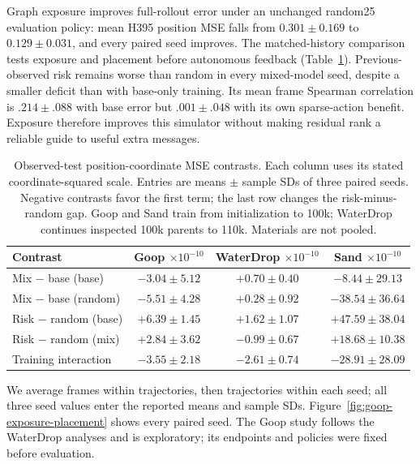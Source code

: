Graph exposure improves full-rollout error under an unchanged random25 evaluation policy: mean H395 position MSE falls from $0.301\pm0.169$ to $0.129\pm0.031$, and every paired seed improves. The matched-history comparison tests exposure and placement before autonomous feedback (Table~\ref{tab:goop-exposure-placement}). Previous-observed risk remains worse than random in every mixed-model seed, despite a smaller deficit than with base-only training. Its mean frame Spearman correlation is $.214\pm.088$ with base error but $.001\pm.048$ with its own sparse-action benefit. Exposure therefore improves this simulator without making residual rank a reliable guide to useful extra messages.

\begin{table}[t]
\centering\scriptsize
\caption{Observed-test position-coordinate MSE contrasts. Each column uses its stated coordinate-squared scale. Entries are means $\pm$ sample SDs of three paired seeds. Negative contrasts favor the first term; the last row changes the risk-minus-random gap. Goop and Sand train from initialization to 100k; WaterDrop continues inspected 100k parents to 110k. Materials are not pooled.}
\label{tab:goop-exposure-placement}
\setlength{\tabcolsep}{2pt}
\begin{tabular}{lccc}
\toprule
Contrast & \shortstack{Goop\\$\times10^{-10}$} & \shortstack{WaterDrop\\$\times10^{-10}$} & \shortstack{Sand\\$\times10^{-10}$}\\
\midrule
Mix $-$ base (base) & $-3.04\pm5.12$ & $+0.70\pm0.40$ & $-8.44\pm29.13$\\
Mix $-$ base (random) & $-5.51\pm4.28$ & $+0.28\pm0.92$ & $-38.54\pm36.64$\\
Risk $-$ random (base) & $+6.39\pm1.45$ & $+1.62\pm1.07$ & $+47.59\pm38.04$\\
Risk $-$ random (mix) & $+2.84\pm3.62$ & $-0.99\pm0.67$ & $+18.68\pm10.38$\\
Training interaction & $-3.55\pm2.18$ & $-2.61\pm0.74$ & $-28.91\pm28.09$\\
\bottomrule
\end{tabular}
\end{table}

We average frames within trajectories, then trajectories within each seed; all three seed values enter the reported means and sample SDs. Figure~\ref{fig:goop-exposure-placement} shows every paired seed. The Goop study follows the WaterDrop analyses and is exploratory; its endpoints and policies were fixed before evaluation.


